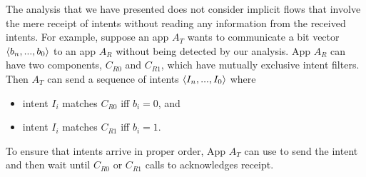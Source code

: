 {%
The analysis that we have presented does not consider implicit flows that
involve the mere receipt of intents without reading any information from the
received intents.  For example, suppose an app $A_T$ wants to communicate a bit vector 
$\langle b_n, ..., b_0 \rangle$ to an app $A_R$ without being
detected by our analysis.  App $A_R$ can have two components, $C_{R0}$ and $C_{R1}$, 
which have mutually exclusive intent filters.
Then $A_T$ can send a sequence of intents $\langle I_n, ..., I_0 \rangle$ where 
\begin{itemize}[topsep=0.25ex,itemsep=0ex,parsep=0ex]
\item intent $I_i$ matches $C_{R0}$ iff $b_i = 0$, and
\item intent $I_i$ matches $C_{R1}$ iff $b_i = 1$.
\end{itemize}
To ensure that intents arrive in proper order, App $A_T$ can use
 to send the intent and then wait until $C_{R0}$ or
$C_{R1}$ calls  to acknowledges receipt.

}
